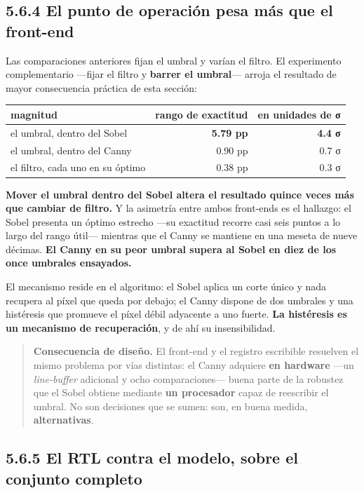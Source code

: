 \subsection{5.6.4 El punto de operación pesa más que el
front-end}\label{el-punto-de-operaciuxf3n-pesa-muxe1s-que-el-front-end}

Las comparaciones anteriores fijan el umbral y varían el filtro. El
experimento complementario ---fijar el filtro y \textbf{barrer el
umbral}--- arroja el resultado de mayor consecuencia práctica de esta
sección:

\begin{longtable}[]{@{}lrr@{}}
\toprule\noalign{}
magnitud & rango de exactitud & en unidades de σ \\
\midrule\noalign{}
\endhead
\bottomrule\noalign{}
\endlastfoot
el umbral, dentro del Sobel & \textbf{5.79 pp} & \textbf{4.4 σ} \\
el umbral, dentro del Canny & 0.90 pp & 0.7 σ \\
el filtro, cada uno en su óptimo & 0.38 pp & 0.3 σ \\
\end{longtable}

\textbf{Mover el umbral dentro del Sobel altera el resultado quince
veces más que cambiar de filtro.} Y la asimetría entre ambos front-ends
es el hallazgo: el Sobel presenta un óptimo estrecho ---su exactitud
recorre casi seis puntos a lo largo del rango útil--- mientras que el
Canny se mantiene en una meseta de nueve décimas. \textbf{El Canny en su
peor umbral supera al Sobel en diez de los once umbrales ensayados.}

El mecanismo reside en el algoritmo: el Sobel aplica un corte único y
nada recupera al píxel que queda por debajo; el Canny dispone de dos
umbrales y una histéresis que promueve el píxel débil adyacente a uno
fuerte. \textbf{La histéresis es un mecanismo de recuperación}, y de ahí
su insensibilidad.

\begin{quote}
\textbf{Consecuencia de diseño.} El front-end y el registro escribible
resuelven el mismo problema por vías distintas: el Canny adquiere
\textbf{en hardware} ---un \emph{line-buffer} adicional y ocho
comparaciones--- buena parte de la robustez que el Sobel obtiene
mediante \textbf{un procesador} capaz de reescribir el umbral. No son
decisiones que se sumen: son, en buena medida, \textbf{alternativas}.
\end{quote}

\subsection{5.6.5 El RTL contra el modelo, sobre el conjunto
completo}\label{el-rtl-contra-el-modelo-sobre-el-conjunto-completo}

